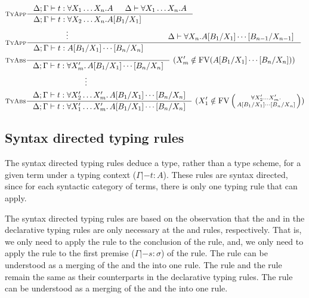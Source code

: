 {\small
\begin{align*}
& \inference[\sc TyApp]
	{\Delta;\Gamma |- t : \forall X_1\dots X_n.A & \Delta |- \forall X_1\dots X_n.A}
	{\Delta;\Gamma |- t : \forall X_2\dots X_n.A[B_1/X_1]
	\qquad\qquad\quad~~} \\
& \inference[\sc TyApp]
	{ \qquad\qquad \vdots \qquad\qquad\qquad\qquad\qquad \quad
	& \Delta |- \forall X_n.A[B_1/X_1]\cdots[B_{n-1}/X_{n-1}]
	}
	{ \Delta;\Gamma |- t : A[B_1/X_1]\cdots[B_n/X_n] \qquad \qquad
	 \qquad\qquad\qquad\qquad\qquad\qquad\qquad\quad
 	} \\
& \inference[\sc TyAbs]
	{}
	{\Delta;\Gamma |- t : \forall X_m'.\,A[B_1/X_1]\cdots[B_n/X_n]} ~
	(X_m'\notin\FV(A[B_1/X_1]\cdots[B_n/X_n])) \\
& \qquad\qquad\qquad\qquad\qquad \vdots \\
& \inference[\sc TyAbs]
	{\Delta;\Gamma |- t : \forall X_2'\dots X_m'.\,A[B_1/X_1]\cdots[B_n/X_n]}
	{\Delta;\Gamma |- t : \forall X_1'\dots X_m'.\,A[B_1/X_1]\cdots[B_n/X_n]} ~
	(X_1'\notin\FV\left(\begin{smallmatrix}\forall X_2'\dots X_m'.\\A[B_1/X_1]\cdots[B_n/X_n]\end{smallmatrix}\right))
\end{align*}
} %

\subsection{Syntax directed typing rules}\label{sec:hm:syntyrule}
The syntax directed typing rules \cite{Clement86} deduce a type,
rather than a type scheme, for a given term under a typing context
($\Gamma |- t : A$). These rules are syntax directed, since 
for each syntactic category of terms, there is only one typing rule that can apply.

The syntax directed typing rules are based on the observation
that the  and  in the declarative typing rules
are only necessary at the  and  rules, respectively.
That is, we only need to apply the  rule to the conclusion of
the  rule, and, we only need to apply the  rule to
the first premise ($\Gamma |- s:\sigma$) of the  rule.
The  rule can be understood as a merging of the
 and the  into one rule.
The  rule and the  rule remain the same as
their counterparts in the declarative typing rules.
The  rule can be understood as a merging of
the  and the  into one rule.

